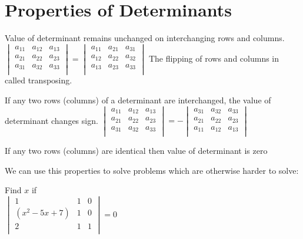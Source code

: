 \section{Properties of Determinants}
\begin{theorem}
Value of determinant remains unchanged on interchanging rows and columns.\\
    $\begin{vmatrix}
         a_{11} & a_{12} & a_{13} \\
    a_{21} & a_{22} & a_{23} \\
    a_{31} & a_{32} & a_{33} \\
    \end{vmatrix} = \begin{vmatrix}
         a_{11} & a_{21} & a_{31} \\
    a_{12} & a_{22} & a_{32} \\
    a_{13} & a_{23} & a_{33} \\
    \end{vmatrix}$
    The flipping of rows and columns in called transposing.\\
\end{theorem}
\begin{theorem}
If any two rows (columns) of a determinant are interchanged, the value of determinant changes sign.
$\begin{vmatrix}
    a_{11} & a_{12} & a_{13} \\
    a_{21} & a_{22} & a_{23} \\
    a_{31} & a_{32} & a_{33} \\
\end{vmatrix} = - \begin{vmatrix}
    a_{31} & a_{32} & a_{33} \\
    a_{21} & a_{22} & a_{23} \\
    a_{11} & a_{12} & a_{13} \\
\end{vmatrix}$
\end{theorem}
\begin{theorem}
If any two rows (columns) are identical then value
of determinant is zero 
\end{theorem}
We can use this properties to solve problems which are otherwise harder to solve:\\
\begin{example}
    Find $x$ if\\
    $\begin{vmatrix}
        1  & 1 & 0\\
        (x^2-5x+7) & 1 & 0\\
        2 & 1 & 1\\
    \end{vmatrix} = 0$
\end{example}

